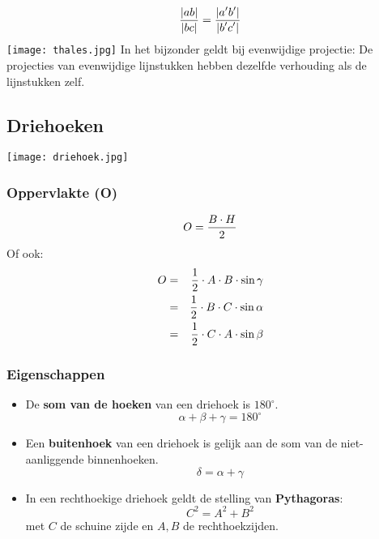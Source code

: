 \[\displaystyle\frac{\displaystyle |ab|}{\displaystyle |bc|}=\displaystyle\frac{\displaystyle |a'b'|}{\displaystyle |b'c'|}\]
\texttt{[image: thales.jpg]}
In het bijzonder geldt bij evenwijdige projectie:
De projecties van evenwijdige lijnstukken hebben dezelfde verhouding als de lijnstukken zelf.

\subsection{Driehoeken} \label{driehoeken}
\hypertarget{driehoeken}{}

\texttt{[image: driehoek.jpg]}

\subsubsection{Oppervlakte (O)} \label{oppervlakte driehoek}
\hypertarget{oppervlakte_driehoek}{}
	\[O=\displaystyle\frac{\displaystyle B\cdot H}{\displaystyle 2}\]
	Of ook:\newline\label{alternatief}
	\begin{eqnarray*}
	O &=&\displaystyle\frac{\displaystyle 1}{\displaystyle 2}\cdot A\cdot B\cdot \sin\gamma \\
	  &=&\displaystyle\frac{\displaystyle 1}{\displaystyle 2}\cdot B\cdot C\cdot \sin\alpha \\
	  &=&\displaystyle\frac{\displaystyle 1}{\displaystyle 2}\cdot C\cdot A\cdot \sin\beta \\
	\end{eqnarray*}

\subsubsection{Eigenschappen} \label{eigenschappen}
\hypertarget{eigenschappen}{}
		\begin{itemize}%
		\item De {\bf som van de hoeken} van een driehoek is 	$180^{\circ}$.
		\[\alpha+\beta+\gamma=180^{\circ}\]
		\item Een \hypertarget{buitenhoek}{{\bf buitenhoek}} \label{buitenhoek} van een driehoek is gelijk aan de som 		van de niet-aanliggende binnenhoeken.
		\[\delta=\alpha+\gamma\]
		\item In een rechthoekige driehoek geldt de stelling van \hypertarget{pythagoras}{{\bf Pythagoras}}: 		\label{Pythagoras} \[C^2=A^2+B^2\] met $C$ de schuine zijde en $A, B$ de 		rechthoekzijden.
		\end{itemize}%

